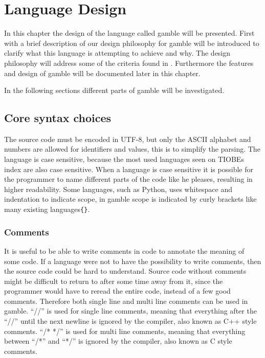 \chapter{Language Design}
\label{cha:Design}
In this chapter the design of the language called \gls{gamble} will be presented.
First with a brief description of our design philosophy for \gls{gamble} will be introduced to clarify what this language is attempting to achieve and why.
The design philosophy will address some of the criteria found in .
Furthermore the features and design of \gls{gamble} will be documented later in this chapter.



In the following sections different parts of \gls{gamble} will be investigated.

\section{Core syntax choices}
The source code must be encoded in UTF-8, but only the ASCII alphabet and numbers are allowed for identifiers and values, this is to simplify the parsing. 
The language is case sensitive, because the most used languages seen on TIOBEs index\citep{TIOBE} are also case sensitive.
When a language is case sensitive it is possible for the programmer to name different parts of the code like he pleases, resulting in higher readability. 
Some languages, such as Python, uses whitespace and indentation to indicate scope, in \gls{gamble} scope is indicated by curly brackets like many existing languages\texttt{\{\}}.  

\subsection*{Comments}
It is useful to be able to write comments in code to annotate the meaning of some code.
If a language were not to have the possibility to write comments, then the source code could be hard to understand.
Source code without comments might be difficult to return to after some time away from it, since the programmer would have to reread the entire code, instead of a few good comments.\citep{Commenting}
Therefore both single line and multi line comments can be used in \gls{gamble}. 
``//'' is used for single line comments, meaning that everything after the ``//'' until the next newline is ignored by the compiler, also known as C++ style comments. 
``/* */'' is used for multi line comments, meaning that everything between ``/*'' and ``*/'' is ignored by the compiler, also known as C style comments. 

